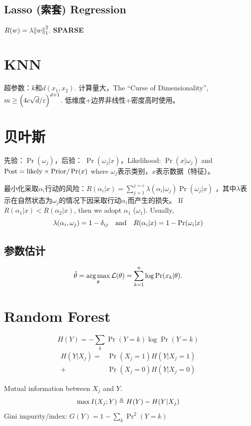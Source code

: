 \documentclass[a4paper,landscape]{article}
\begin{document}
\begin{tiny}
\begin{multicols}{4}
		\subsection{Lasso (索套) Regression}
		$R(w)=\lambda\norm{w}_1^2$. \textbf{SPARSE}

		\section{KNN}
		超参数：$k$和$d(x_1,x_2)$. 计算量大，The “Curse of Dimensionality”, $m\ge \qty(4c\sqrt{d}/\varepsilon)^{d+1}$. 低维度+边界非线性+密度高时使用。

		\section{贝叶斯}
		先验：$\Pr(\omega_j)$，后验： $\Pr(\omega_j|x)$，Likelihood: $\Pr(x|\omega_j)$ and $\-{Post}=\-{likely}\times\-{Prior}/\Pr(x)$ where $\omega_j$表示类别，$x$表示数据（特征）。

		最小化采取$\alpha_i$行动的风险：$R(\alpha_i|x)=\sum_{j=1}^{j=c}\lambda(\alpha_i|\omega_j)\Pr(\omega_j|x)$ ，其中$\lambda$表示在自然状态为$\omega_j$的情况下因采取行动$\alpha_i$而产生的损失。
		If $R(\alpha_1|x)<R(\alpha_2|x)$, then we adopt $\alpha_1$ ($\omega_1$).
		Usually, \[\lambda(\alpha_i,\omega_j)=1-\delta_{ij} \qand R(\alpha_i|x)=1-\Pr(\omega_i|x)\]

		\subsection{参数估计}
		\[
			\hat{\theta}=\argmax_\theta \+L(\theta)=\sum_{k=1}^n \log\Pr(x_k|\theta)
			.\]

		\section{Random Forest}

		\begin{defi}[Entropy]
			\[
				H(Y)=-\sum_k \Pr(Y=k)\log \Pr(Y=k)
			\]
			\[
				\begin{aligned}
					H(Y|X_j)= & \Pr(X_j=1)H(Y|X_j=1) \\+&\Pr(X_j=0)H(Y|X_j=0)
				\end{aligned}
			\]
		\end{defi}
		Mutual information between  $X_j$ and $Y$.
		\[
			\max I(X_j;Y)
			\defeq
			H(Y)-H(Y|X_j)
		\]
		Gini impurity/index: $G(Y)=1-\sum_k\Pr^2(Y=k)$


\end{multicols}
\end{tiny}
\end{document}
